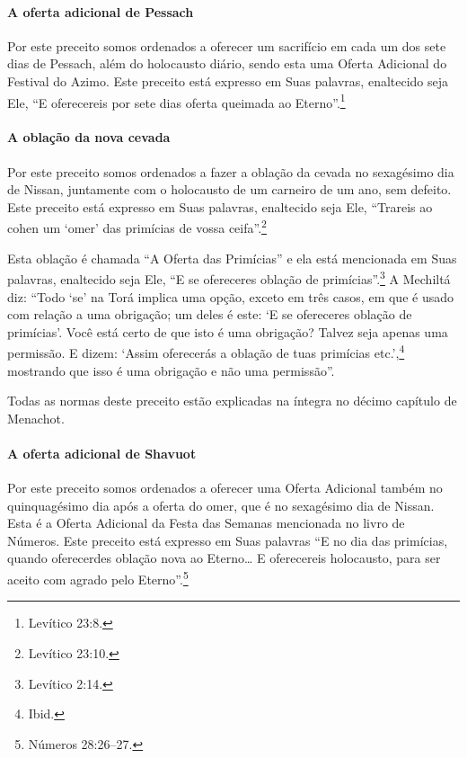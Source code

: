 \begin{multicols}{2}
\paragraph{A oferta adicional de Pessach\starr{}}

Por este preceito somos ordenados a oferecer um sacrifício em cada um
dos sete dias de Pessach\starr, além do holocausto diário, sendo esta uma
Oferta Adicional do Festival do Azimo. Este preceito está expresso em
Suas palavras, enaltecido seja Ele, ``E oferecereis por sete dias
oferta queimada ao Eterno''.\footnote{Levítico 23:8.}

\paragraph{A oblação da nova cevada}

Por este preceito somos ordenados a fazer a oblação da cevada no
sexagésimo dia de Nissan\starr, juntamente com o holocausto de um carneiro de
um ano, sem defeito. Este preceito está expresso em Suas palavras,
enaltecido seja Ele, ``Trareis ao cohen\starr{} um `omer' das primícias de
vossa ceifa''.\footnote{Levítico 23:10.}

Esta oblação é chamada ``A Oferta das Primícias'' e ela está mencionada
em Suas palavras, enaltecido seja Ele, ``E se ofereceres oblação de
primícias''.\footnote{Levítico 2:14.} A Mechiltá\starr{} diz: ``Todo `se' na Torá\starr{}
implica uma opção, exceto em três casos, em que é usado com relação a
uma obrigação; um deles é este: `E se ofereceres oblação de primícias'.
Você está certo de que isto é uma obrigação? Talvez seja apenas uma
permissão. E dizem: `Assim oferecerás a oblação de tuas primícias etc.',\footnote{Ibid.} mostrando que isso é uma obrigação e não uma permissão''.

Todas as normas deste preceito estão explicadas na íntegra no décimo
capítulo de Menachot\starr.


\paragraph{A oferta adicional de Shavuot\starr}

Por este preceito somos ordenados a oferecer uma Oferta Adicional também
no quinquagésimo dia após a oferta do omer\starr, que é no sexagésimo dia
de Nissan\starr. Esta é a Oferta Adicional da Festa das Semanas mencionada no
livro de Números. Este preceito está expresso em Suas palavras ``E no
dia das primícias, quando oferecerdes oblação nova ao Eterno\ldots{} E
oferecereis holocausto, para ser aceito com agrado pelo Eterno''.\footnote{Números 28:26--27.}


\end{multicols}
